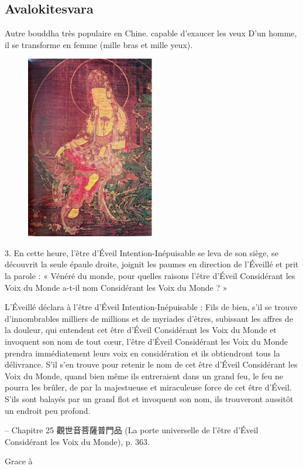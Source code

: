 \subsection{Avalokitesvara} 
Autre bouddha très populaire en Chine. capable d'exaucer les veux D'un homme, il se transforme en femme (mille bras et mille yeux). 
\begin{figure}
    \centering
        \includegraphics[width=0.5\textwidth]{ConfucianismeTaoismeBouddhismeChinois/Images/guanyin.jpg}

    \label{fig:enter-label}
\end{figure}


\begin{singlequote}
    3.	En cette heure, l’être d’Éveil Intention-Inépuisable se leva de son siège, se découvrit la seule épaule droite, joignit les paumes en direction de l’Éveillé et prit la parole : « Vénéré du monde, pour quelles raisons l’être d’Éveil Considérant les Voix du Monde a-t-il nom Considérant les Voix du Monde ? »

L’Éveillé déclara à l’être d’Éveil Intention-Inépuisable :
Fils de bien, s’il se trouve d’innombrables milliers de millions et de myriades d’êtres, subissant les affres de la douleur, qui entendent cet être d’Éveil Considérant les Voix du Monde et invoquent son nom de tout cœur, l’être d’Éveil Considérant les Voix du Monde prendra immédiatement leurs voix en considération et ils obtiendront tous la délivrance. S’il s’en trouve pour retenir le nom de cet être d’Éveil Considérant les Voix du Monde, quand bien même ils entreraient dans un grand feu, le feu ne pourra les brûler, de par la majestueuse et miraculeuse force de cet être d’Éveil.
S’ils sont balayés par un grand flot et invoquent son nom, ils trouveront aussitôt un endroit peu profond.



-- Chapitre 25 觀世音菩薩普門品 (La porte universelle de l’être d’Éveil Considérant les
Voix du Monde), p. 363.
\end{singlequote}
Grace à 


